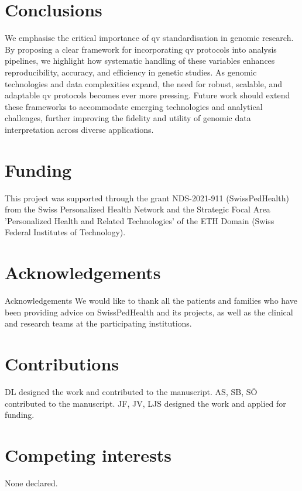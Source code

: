 \section{Conclusions}
We emphasise the critical importance of \ac{qv} standardisation in genomic research. By proposing a clear framework for incorporating \ac{qv} protocols into analysis pipelines, we highlight how systematic handling of these variables enhances reproducibility, accuracy, and efficiency in genetic studies. As genomic technologies and data complexities expand, the need for robust, scalable, and adaptable \ac{qv} protocols becomes ever more pressing. Future work should extend these frameworks to accommodate emerging technologies and analytical challenges, further improving the fidelity and utility of genomic data interpretation across diverse applications.

\section{Funding}
This project was supported through the grant NDS-2021-911 (SwissPedHealth) from the Swiss Personalized Health Network and the Strategic Focal Area 'Personalized Health and Related Technologies' of the ETH Domain (Swiss Federal Institutes of Technology).

\section{Acknowledgements}

Acknowledgements We would like to thank all the patients and families who have been providing advice on SwissPedHealth and its projects, as well as the clinical and research teams at the participating institutions.

\section{Contributions}
DL designed the work and contributed to the manuscript.
AS, SB, SÖ  contributed to the manuscript.
JF, JV, LJS designed the work and applied for funding.

\section{Competing interests}
None declared.

